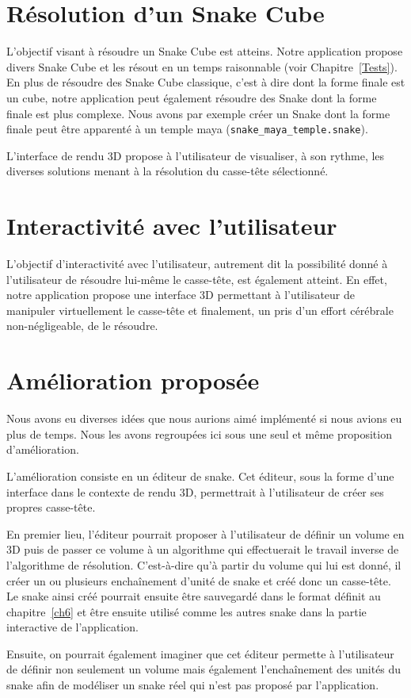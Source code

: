 \section{Résolution d'un Snake Cube}
L'objectif visant à résoudre un Snake Cube est atteins. Notre application propose divers Snake Cube et les résout en un temps raisonnable (voir Chapitre~\ref{Tests}). En plus de résoudre des Snake Cube classique, c'est à dire dont la forme finale est un cube, notre application peut également résoudre des Snake dont la forme finale est plus complexe. Nous avons par exemple créer un Snake dont la forme finale peut être apparenté à un temple maya (\verb|snake_maya_temple.snake|).

L'interface de rendu 3D propose à l'utilisateur de visualiser, à son rythme, les diverses solutions menant à la résolution du casse-tête sélectionné.

\section{Interactivité avec l'utilisateur}
L'objectif d'interactivité avec l'utilisateur, autrement dit la possibilité donné à l'utilisateur de résoudre lui-même le casse-tête, est également atteint. En effet, notre application propose une interface 3D permettant à l'utilisateur de manipuler virtuellement le casse-tête et finalement, un pris d'un effort cérébrale non-négligeable, de le résoudre.

\section{Amélioration proposée}
Nous avons eu diverses idées que nous aurions aimé implémenté si nous avions eu plus de temps. Nous les avons regroupées ici sous une seul et même proposition d'amélioration.

L'amélioration consiste en un éditeur de snake. Cet éditeur, sous la forme d'une interface dans le contexte de rendu 3D, permettrait à l'utilisateur de créer ses propres casse-tête.

En premier lieu, l'éditeur pourrait proposer à l'utilisateur de définir un volume en 3D puis de passer ce volume à un algorithme qui effectuerait le travail inverse de l'algorithme de résolution. C'est-à-dire qu'à partir du volume qui lui est donné, il créer un ou plusieurs enchaînement d'unité de snake et créé donc un casse-tête. Le snake ainsi créé pourrait ensuite être sauvegardé dans le format définit au chapitre~\ref{ch6} et être ensuite utilisé comme les autres snake dans la partie interactive de l'application.

Ensuite, on pourrait également imaginer que cet éditeur permette à l'utilisateur de définir non seulement un volume mais également l'enchaînement des unités du snake afin de modéliser un snake réel qui n'est pas proposé par l'application.
